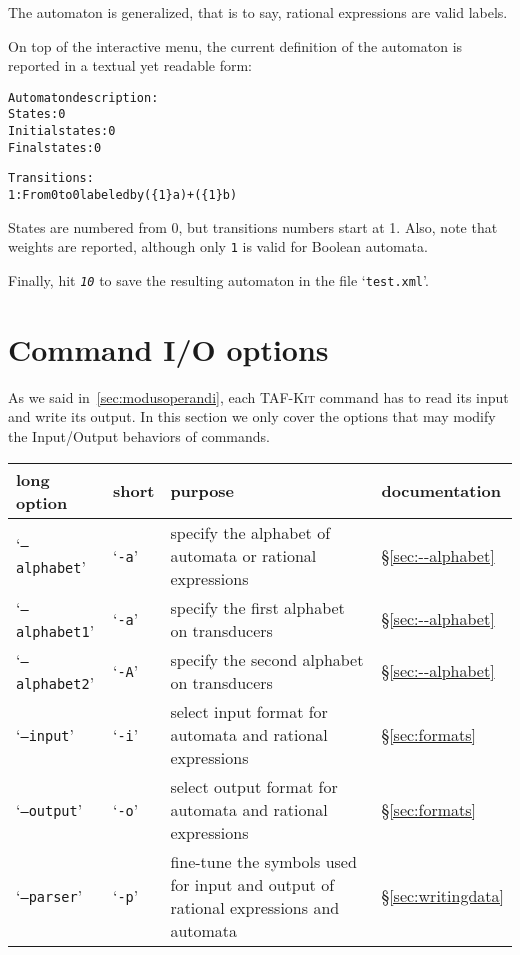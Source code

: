 \documentclass[a4paper]{report}
\newenvironment{shell}
{\begin{alltt}}
{\end{alltt}}
\newcommand\kbd[1]{\textsl{\texttt{#1}}}
\newcommand\file[1]{`\texttt{#1}'}
\newcommand\code[1]{\texttt{#1}}
\newcommand\samp[1]{`\texttt{#1}'}
\newcommand{\tafkit}{\textsc{TAF-Kit}\xspace}
\begin{document}
\noindent
The automaton is generalized, that is to say, rational expressions are
valid labels.

On top of the interactive menu, the current definition of the
automaton is reported in a textual yet readable form:

\begin{shell}
Automaton description:
  States: 0
  Initial states: 0
  Final states: 0

  Transitions:
    1: From 0 to 0 labeled by (\{1\} a)+(\{1\} b)
\end{shell}

\noindent
States are numbered from 0, but transitions numbers start at 1.  Also,
note that weights are reported, although only \code{1} is valid for
Boolean automata.

Finally, hit \kbd{10} to save the resulting automaton in the file
\file{test.xml}.



\section{Command I/O options}\label{sec:iooption}

As we said in~\autoref{sec:modusoperandi}, each \tafkit command has to
read its input and write its output.  In this section we only cover
the options that may modify the Input/Output behaviors of commands.

\begin{center}
\begin{tabular}{llp{}l}
  long option & short & purpose & documentation \\
  \hline
  \samp{--alphabet} & \samp{-a} & specify the alphabet of automata or rational expressions  & \S\ref{sec:--alphabet}\\
  \samp{--alphabet1} & \samp{-a} & specify the first alphabet on transducers & \S\ref{sec:--alphabet}\\
  \samp{--alphabet2} & \samp{-A} & specify the second alphabet on transducers & \S\ref{sec:--alphabet}\\
  \samp{--input} & \samp{-i} & select input format for automata and rational expressions & \S\ref{sec:formats}\\
  \samp{--output} & \samp{-o} & select output format for automata and rational expressions & \S\ref{sec:formats}\\
  \samp{--parser} & \samp{-p} & fine-tune the symbols used for input and output of rational expressions and automata & \S\ref{sec:writingdata}\\
\hline
\end{tabular}
 \end{center}
\end{document}
